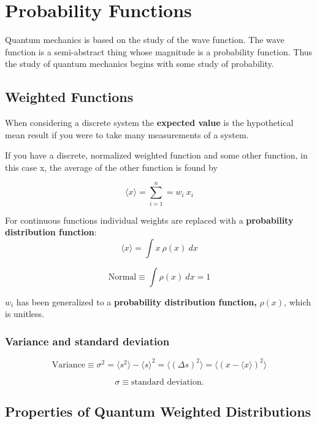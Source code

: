 \section{Probability Functions}
Quantum mechanics is based on the study of the wave function. The wave function is a semi-abstract thing whose magnitude is a probability function. Thus the study of quantum mechanics begins with some study of probability.

\subsection{Weighted Functions}
When considering a discrete system the \textbf{expected value} is the hypothetical mean result if you were to take many measurements of a system. 

If you have a discrete, normalized weighted function and some other function, in this case x, the average of the other function is found by

\begin{equation}
  \langle x \rangle = \sum_{i=1}^{n}=w_{i}~x_{i}
\end{equation}



For continuous functions individual weights are replaced with a \textbf{probability distribution function}:
\begin{equation}
  \langle x\rangle = \int x~\rho(x)~dx
\end{equation}

\begin{equation}
  \text{Normal}\equiv \int\rho(x)~dx =1
\end{equation}

$ w_{i} $ has been generalized to a \textbf{probability distribution function,} $ \rho(x) $, which is unitless. 






\subsubsection{Variance and standard deviation}
\begin{equation}
  \text{Variance}\equiv\sigma^2=\langle s^2 \rangle - \langle s\rangle^2=\langle{(\Delta s)}^2\rangle=\langle{(x-\langle x\rangle)}^2\rangle
\end{equation}

\[\sigma\equiv\text{standard deviation}.\]


\subsection{Properties of Quantum Weighted Distributions}

